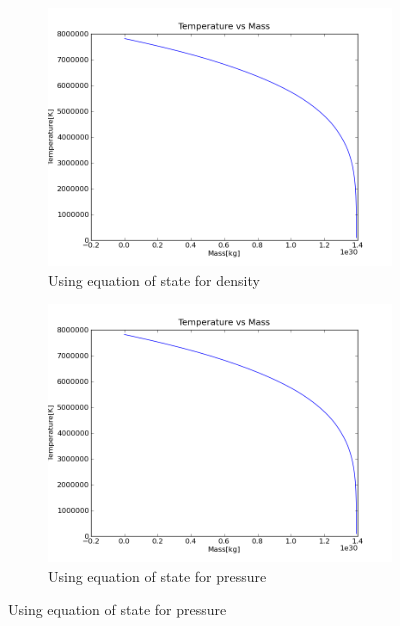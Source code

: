 \documentclass[a4paper,12pt]{article}
\begin{document}
\begin{figure}[H]
    \centering
    \begin{subfigure}{0.49\textwidth}
      \includegraphics[width=\textwidth]{Calculate_density/Temperature_for_rho_p_t_others_constant}
      \caption{Using equation of state for density}
      \label{fig:Temp_density}
    \end{subfigure}
    \begin{subfigure}{0.49\textwidth}
      \includegraphics[width=\textwidth]{Calculate_pressure/Temperature_for_rho_p_t_others_constant}
      \caption{Using equation of state for pressure}
      \label{fig:Temp_pressure}
    \end{subfigure}
\end{figure}
\end{document}
